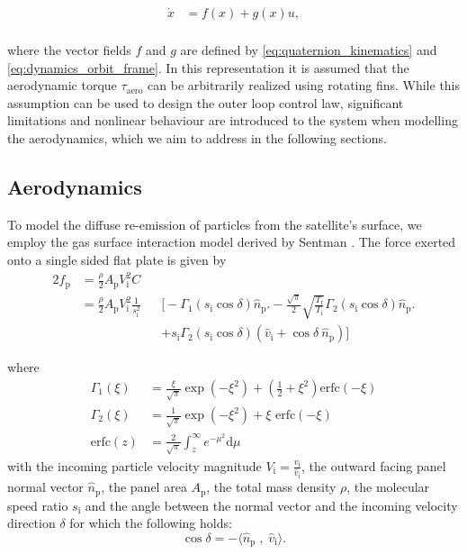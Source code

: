 \documentclass[pdflatex,sn-mathphys-num]{sn-jnl}%
\theoremstyle{thmstyleone}%
\theoremstyle{thmstyletwo}%
\theoremstyle{thmstylethree}%
\begin{document}
		\begin{equation}
			\begin{aligned}
				\dot{x} &= f(x) + g(x)u, \\
			\end{aligned}
		\end{equation}
 
		where the vector fields $f$ and $g$ are defined by \cref{eq:quaternion_kinematics} and \cref{eq:dynamics_orbit_frame}. In this representation it is assumed that the aerodynamic torque $\tau_{\text{aero}}$ can be arbitrarily realized using rotating fins. While this assumption can be used to design the outer loop control law, significant limitations and nonlinear behaviour are introduced to the system when modelling the aerodynamics, which we aim to address in the following sections.



        \subsection{Aerodynamics}
		\label{sec:aerodynamics}
		To model the diffuse re-emission of particles from the satellite's surface, we employ the gas surface interaction model derived by Sentman \cite{sentman_free_1961}. The force exerted onto a single sided flat plate is given by
		\newcommand{\ii}{\text{i}}
		\newcommand{\pp}{\text{p}}
		\newcommand{\cosd}{\cos \delta}
		\begin{alignat}{2}
            \label{eq:plate_force_sentman}
			f_\text{p} 
			&= \frac{\rho}{2} A_\pp V_\ii^2 C &&\nonumber\\
			&= \frac{\rho}{2} A_\pp V_\ii^2\frac{1}{s_\ii^2}
			&&\Bigg[
				- \Gamma_1(s_\ii \cosd) \hat{n}_\pp \Bigg.
				- \frac{\sqrt{\pi}}{2} \sqrt{\frac{T_\text{r}}{T_\ii}} \Gamma_2(s_\ii \cosd) \hat{n}_\pp
				\Bigg.\\ \nonumber
                &&& + s_\ii \Gamma_2(s_\ii \cosd) \left(\hat{v}_\ii + \cosd ~\hat{n}_\pp\right)
			\Bigg]
		\end{alignat}

		where
		\begin{align*}
			\Gamma_1(\xi) &= \frac{\xi}{\sqrt{\pi}} \exp (-\xi^2) + \left(\frac{1}{2} + \xi^2 \right) \text{erfc} (-\xi) \\
			\Gamma_2(\xi) &= \frac{1}{\sqrt{\pi}} \exp (-\xi^2) + \xi \text{ erfc}(-\xi) \\
			\text{erfc}(z) &= \frac{2}{\sqrt{\pi}} \int_{z}^{\infty}e^{-\mu^2} \mathrm{d}\mu
		\end{align*}
		with the incoming particle velocity magnitude $V_\ii = \frac{v_\ii}{\hat{v}_\ii}$, the outward facing panel normal vector $\hat{n}_\pp$, the panel area $A_\pp$, the total mass density $\rho$, the molecular speed ratio $s_\ii$ and the angle between the normal vector and the incoming velocity direction $\delta$ for which the following holds:
		\begin{equation}
			\cosd = - \langle \hat{n}_\pp \; , \; \hat{v}_\ii \rangle.
		\end{equation}
\end{document}
